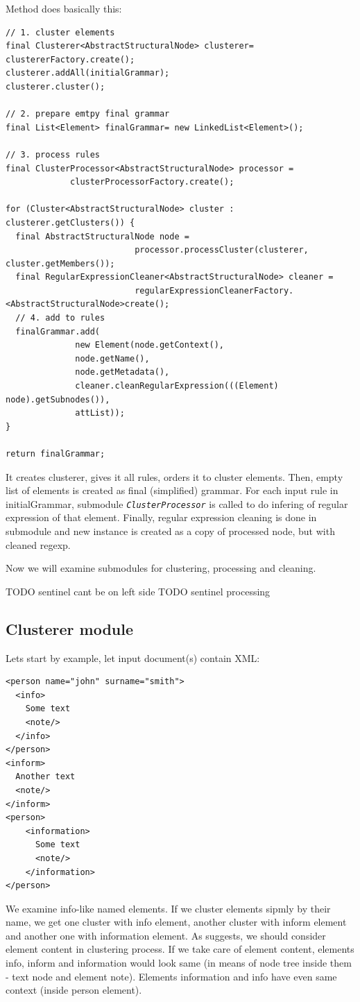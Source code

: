 \documentclass[a4paper,10pt,oneside]{article}
\newcommand{\code}[1]{\texttt{\StrSubstitute{#1}{.}{.\.}}}
\def\.{\discretionary{}{}{}}
\newcommand{\jmodule}[1]{\texttt{\textit{#1}}}
\begin{document}
Method \code{TwoStepSimplifier.simplify()} does basically this:
\begin{verbatim}
// 1. cluster elements
final Clusterer<AbstractStructuralNode> clusterer= clustererFactory.create();
clusterer.addAll(initialGrammar);
clusterer.cluster();

// 2. prepare emtpy final grammar
final List<Element> finalGrammar= new LinkedList<Element>();

// 3. process rules
final ClusterProcessor<AbstractStructuralNode> processor =
             clusterProcessorFactory.create();
             
for (Cluster<AbstractStructuralNode> cluster : clusterer.getClusters()) {
  final AbstractStructuralNode node =  
                          processor.processCluster(clusterer, cluster.getMembers());
  final RegularExpressionCleaner<AbstractStructuralNode> cleaner = 
                          regularExpressionCleanerFactory.<AbstractStructuralNode>create();
  // 4. add to rules
  finalGrammar.add(
              new Element(node.getContext(),
              node.getName(),
              node.getMetadata(),
              cleaner.cleanRegularExpression(((Element) node).getSubnodes()),
              attList));
}

return finalGrammar;
\end{verbatim}
It creates clusterer, gives it all rules, orders it to cluster elements.
Then, empty list of elements is created as final (simplified) grammar.
For each input rule in initialGrammar, submodule \jmodule{ClusterProcessor} is called to do infering of regular expression of that element.
Finally, regular expression cleaning is done in submodule and new \code{Element} instance is created as a copy of processed node, but with cleaned regexp.

Now we will examine submodules for clustering, processing and cleaning.

TODO sentinel cant be on left side
TODO sentinel processing

\subsection{Clusterer module}
Lets start by example, let input document(s) contain XML:
\begin{verbatim}
<person name="john" surname="smith">
  <info>
    Some text
    <note/>
  </info>
</person>
<inform>
  Another text
  <note/>
</inform>
<person>
    <information>
      Some text
      <note/>
    </information>
</person>
\end{verbatim}
We examine info-like named elements.
If we cluster elements sipmly by their name, we get one cluster with info element, another cluster with inform element and another one with information element.
As \cite{1802522} suggests, we should consider element content in clustering process.
If we take care of element content, elements info, inform and information would look same (in means of node tree inside them - text node and element note).
Elements information and info have even same context (inside person element).
\end{document}
